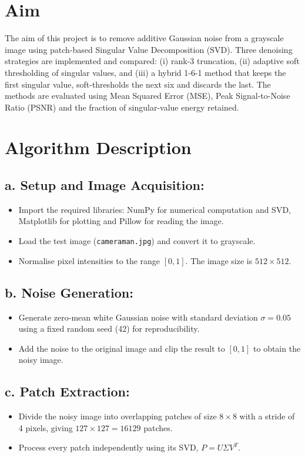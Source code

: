 \documentclass{article}
\begin{document}
\begin{flushleft}

\section{Aim}
The aim of this project is to remove additive Gaussian noise from a grayscale image using patch-based Singular Value Decomposition (SVD). Three denoising strategies are implemented and compared: (i) rank-3 truncation, (ii) adaptive soft thresholding of singular values, and (iii) a hybrid 1-6-1 method that keeps the first singular value, soft-thresholds the next six and discards the last. The methods are evaluated using Mean Squared Error (MSE), Peak Signal-to-Noise Ratio (PSNR) and the fraction of singular-value energy retained.
\\

\section{Algorithm Description}
\subsection*{a. Setup and Image Acquisition:}
\begin{itemize}
    \item Import the required libraries: NumPy for numerical computation and SVD, Matplotlib for plotting and Pillow for reading the image.
    \item Load the test image (\texttt{cameraman.jpg}) and convert it to grayscale.
    \item Normalise pixel intensities to the range $[0, 1]$. The image size is $512 \times 512$.
\end{itemize}

\subsection*{b. Noise Generation:}
\begin{itemize}
    \item Generate zero-mean white Gaussian noise with standard deviation $\sigma = 0.05$ using a fixed random seed (42) for reproducibility.
    \item Add the noise to the original image and clip the result to $[0, 1]$ to obtain the noisy image.
\end{itemize}

\subsection*{c. Patch Extraction:}
\begin{itemize}
    \item Divide the noisy image into overlapping patches of size $8 \times 8$ with a stride of 4 pixels, giving $127 \times 127 = 16129$ patches.
    \item Process every patch independently using its SVD, $P = U \Sigma V^{T}$.
\end{itemize}


\end{flushleft}
\end{document}
